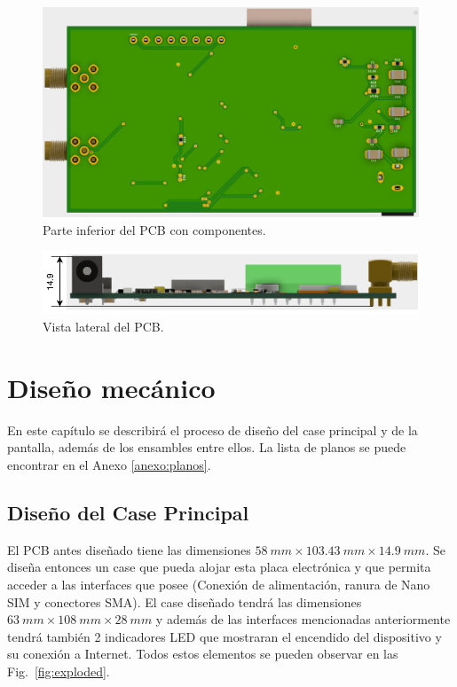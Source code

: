\begin{figure}[hbtp!]
\centering
\includegraphics[width=\textwidth]{board_com_bottom.png}
\caption{Parte inferior del PCB con componentes.}
\label{fig:board_bottom_con}
\end{figure}

\begin{figure}[hbtp!]
\centering
\includegraphics[width=\textwidth]{board_side_dim.pdf}
\caption{Vista lateral del PCB.}
\label{fig:board_side_con}
\end{figure}


\section{Diseño mecánico}

En este capítulo se describirá el proceso de diseño del case principal y de la pantalla, además de los ensambles entre ellos. La lista de planos se puede encontrar en el Anexo \ref{anexo:planos}.

\subsection{Diseño del Case Principal}

El PCB antes diseñado tiene las dimensiones $\SI{58}{mm} \times \SI{103.43}{mm} \times \SI{14.9}{mm}$. Se diseña entonces un case que pueda alojar esta placa electrónica y que permita acceder a las interfaces que posee (Conexión de alimentación, ranura de Nano SIM y conectores SMA). El case diseñado tendrá las dimensiones $\SI{63}{mm} \times \SI{108}{mm} \times \SI{28}{mm}$ y además de las interfaces mencionadas anteriormente tendrá también 2 indicadores LED que mostraran el encendido del dispositivo y su conexión a Internet. Todos estos elementos se pueden observar en las Fig.~\ref{fig:exploded}.



